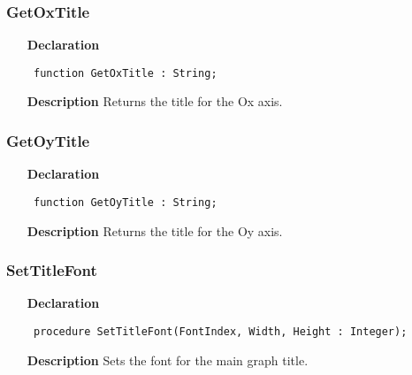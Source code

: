 \documentclass[12pt,a4paper,oneside]{report}
\newcommand{\declarationitem}[1]{\textbf{#1}}
\newcommand{\descriptiontitle}[1]{\textbf{#1}}
\newcommand{\code}[1]{\texttt{#1}}
\begin{document}
\subsubsection{GetOxTitle}
\label{uplot-GetOxTitle}
\begin{itemize}\item[\declarationitem{Declaration}\hfill]
	\begin{flushleft}
		\code{
			function GetOxTitle : String;}
		
	\end{flushleft}
	
	\par
	\item[\descriptiontitle{Description}]
	Returns the title for the Ox axis.
	
\end{itemize}
\subsubsection{GetOyTitle}
\label{uplot-GetOyTitle}
\begin{itemize}\item[\declarationitem{Declaration}\hfill]
	\begin{flushleft}
		\code{
			function GetOyTitle : String;}
		
	\end{flushleft}
	
	\par
	\item[\descriptiontitle{Description}]
	Returns the title for the Oy axis.
	
\end{itemize}
\subsubsection{SetTitleFont}
\label{uplot-SetTitleFont}
\begin{itemize}\item[\declarationitem{Declaration}\hfill]
	\begin{flushleft}
		\code{
			procedure SetTitleFont(FontIndex, Width, Height : Integer);}
		
	\end{flushleft}
	
	\par
	\item[\descriptiontitle{Description}]
	Sets the font for the main graph title.
	
\end{itemize}
\end{document}
